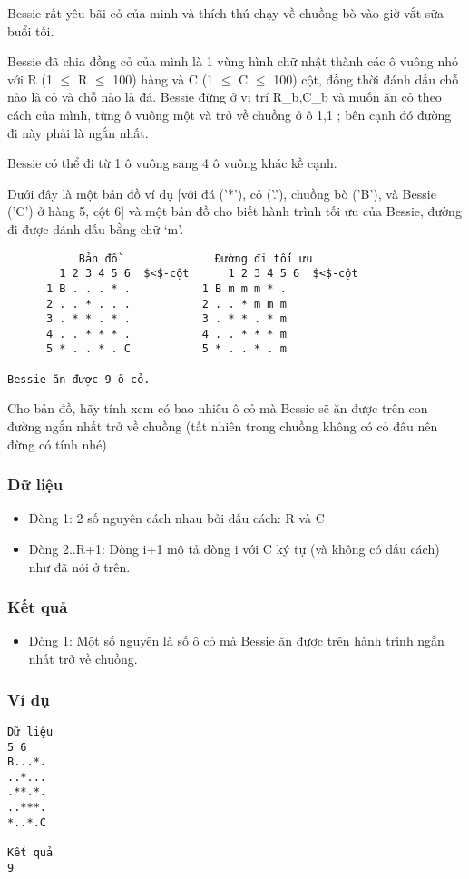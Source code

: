 



   Bessie rất yêu bãi cỏ của mình và thích thú chạy về chuồng bò vào  giờ vắt sữa buổi tối.  

   Bessie đã chia đồng cỏ của mình là 1 vùng hình chữ nhật thành  các ô vuông nhỏ với R (1  $\le$  R  $\le$  100) hàng và C (1  $\le$  C  $\le$  100) cột,  đồng thời đánh dấu chỗ nào là cỏ và chỗ nào là đá. Bessie đứng ở vị  trí R\_b,C\_b và muốn ăn cỏ theo cách của mình, từng ô vuông một và  trở về chuồng ở ô 1,1 ; bên cạnh đó đường đi này phải là ngắn nhất.  

   Bessie có thể đi từ 1 ô vuông sang 4 ô vuông khác kề cạnh.  

   Dưới đây là một bản đồ ví dụ [với đá ('*'), cỏ ('.'),  chuồng bò ('B'),  và Bessie ('C') ở hàng 5, cột 6] và một bản đồ cho biết hành trình  tối ưu của Bessie, đường đi được dánh dấu bằng chữ ‘m’.  
\begin{verbatim}
           Bản đồ               Đường đi tối ưu
        1 2 3 4 5 6  $<$-cột      1 2 3 4 5 6  $<$-cột
      1 B . . . * .           1 B m m m * .
      2 . . * . . .           2 . . * m m m
      3 . * * . * .           3 . * * . * m
      4 . . * * * .           4 . . * * * m
      5 * . . * . C           5 * . . * . m

Bessie ăn được 9 ô cỏ.
\end{verbatim}

   Cho bản đồ, hãy tính xem có bao nhiêu ô cỏ mà Bessie sẽ ăn được trên  con đường ngắn nhất trở về chuồng (tất nhiên trong chuồng không có  cỏ đâu nên đừng có tính nhé)  

\subsubsection{   Dữ liệu  }
\begin{itemize}
	\item     Dòng 1: 2 số nguyên cách nhau bởi dấu cách: R và C   
	\item     Dòng 2..R+1: Dòng i+1 mô tả dòng i với C ký tự (và không có dấu          cách) như đã nói ở trên.   
\end{itemize}

\subsubsection{   Kết quả  }
\begin{itemize}
	\item     Dòng 1: Một số nguyên là số ô cỏ mà Bessie ăn được trên hành        trình ngắn nhất trở về chuồng.   
\end{itemize}

\subsubsection{   Ví dụ  }
\begin{verbatim}
Dữ liệu
5 6
B...*.
..*...
.**.*.
..***.
*..*.C

Kết quả
9
\end{verbatim}

